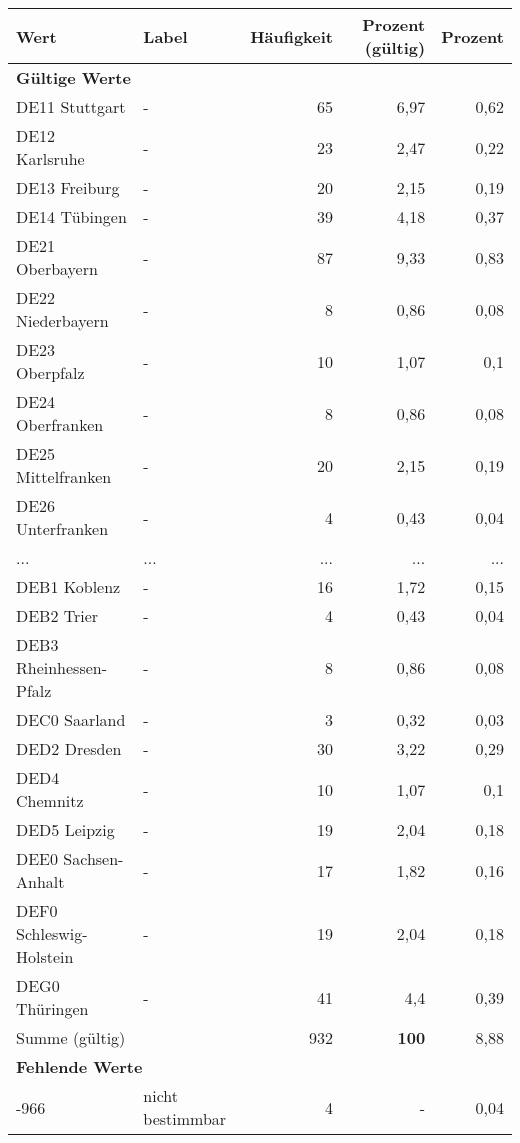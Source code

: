      \begin{longtable}{Xlrrr}
     \toprule
     \textbf{Wert} & \textbf{Label} & \textbf{Häufigkeit} & \textbf{Prozent (gültig)} & \textbf{Prozent} \\
     \endhead
     \midrule
     \multicolumn{5}{l}{\textbf{Gültige Werte}}\\
        \multicolumn{1}{X}{DE11 Stuttgart} & - & 65 & 6,97 & 0,62 \\
        \multicolumn{1}{X}{DE12 Karlsruhe} & - & 23 & 2,47 & 0,22 \\
        \multicolumn{1}{X}{DE13 Freiburg} & - & 20 & 2,15 & 0,19 \\
        \multicolumn{1}{X}{DE14 Tübingen} & - & 39 & 4,18 & 0,37 \\
        \multicolumn{1}{X}{DE21 Oberbayern} & - & 87 & 9,33 & 0,83 \\
        \multicolumn{1}{X}{DE22 Niederbayern} & - & 8 & 0,86 & 0,08 \\
        \multicolumn{1}{X}{DE23 Oberpfalz} & - & 10 & 1,07 & 0,1 \\
        \multicolumn{1}{X}{DE24 Oberfranken} & - & 8 & 0,86 & 0,08 \\
        \multicolumn{1}{X}{DE25 Mittelfranken} & - & 20 & 2,15 & 0,19 \\
        \multicolumn{1}{X}{DE26 Unterfranken} & - & 4 & 0,43 & 0,04 \\
       ... & ... & ... & ... & ... \\
        \multicolumn{1}{X}{DEB1 Koblenz} & - & 16 & 1,72 & 0,15 \\
        \multicolumn{1}{X}{DEB2 Trier} & - & 4 & 0,43 & 0,04 \\
        \multicolumn{1}{X}{DEB3 Rheinhessen-Pfalz} & - & 8 & 0,86 & 0,08 \\
        \multicolumn{1}{X}{DEC0 Saarland} & - & 3 & 0,32 & 0,03 \\
        \multicolumn{1}{X}{DED2 Dresden} & - & 30 & 3,22 & 0,29 \\
        \multicolumn{1}{X}{DED4 Chemnitz} & - & 10 & 1,07 & 0,1 \\
        \multicolumn{1}{X}{DED5 Leipzig} & - & 19 & 2,04 & 0,18 \\
        \multicolumn{1}{X}{DEE0 Sachsen-Anhalt} & - & 17 & 1,82 & 0,16 \\
        \multicolumn{1}{X}{DEF0 Schleswig-Holstein} & - & 19 & 2,04 & 0,18 \\
        \multicolumn{1}{X}{DEG0 Thüringen} & - & 41 & 4,4 & 0,39 \\
     \midrule
      \multicolumn{2}{l}{Summe (gültig)} & 932 &
      \textbf{100} &
         8,88 \\
     \multicolumn{5}{l}{\textbf{Fehlende Werte}}\\
       -966 & nicht bestimmbar & 4 & - & 0,04 \\


\end{longtable}
